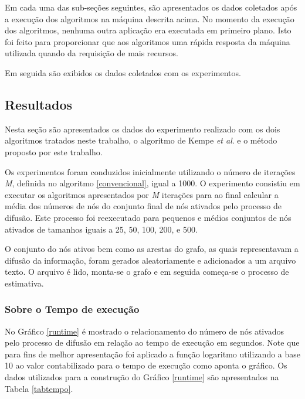 \documentclass{acm_proc_article-sp}
\begin{document}
Em cada uma das sub-seções seguintes, são apresentados os dados coletados após a execução dos algoritmos na
máquina descrita acima. No momento da execução dos algoritmos, nenhuma outra aplicação era executada em primeiro
plano. Isto foi feito para proporcionar que aos algoritmos uma rápida resposta da máquina utilizada quando da
requisição de mais recursos.

Em seguida são exibidos os dados coletados com os experimentos.

\subsection{Resultados}
Nesta seção são apresentados os dados do experimento realizado com os dois algoritmos tratados neste trabalho, o
algoritmo de Kempe \textit{et al}. e o método proposto por este trabalho.

Os experimentos foram conduzidos inicialmente utilizando o número de iterações \textit{M}, definida no algoritmo
\ref{convencional}, igual a 1000. O experimento consistiu em executar os algoritmos apresentados por \textit{M}
iterações para ao final calcular a média dos números de nós do conjunto final de nós ativados pelo processo de
difusão. Este processo foi reexecutado para pequenos e médios conjuntos de nós ativados de tamanhos iguais a 25,
50, 100, 200, e 500.

O conjunto do nós ativos bem como as arestas do grafo, as quais representavam a difusão da informação, foram 
gerados aleatoriamente e adicionados a um arquivo texto. O arquivo é lido, monta-se o grafo e em seguida começa-se
o processo de estimativa.

\subsubsection{Sobre o Tempo de execução}
No Gráfico \ref{runtime} é mostrado o relacionamento do número de nós ativados pelo processo de difusão em relação
ao tempo de execução em segundos. Note que para fins de melhor apresentação foi aplicado a função logaritmo
utilizando a base 10 ao valor contabilizado para o tempo de execução como aponta o gráfico. Os dados utilizados
para a construção do Gráfico \ref{runtime} são apresentados na Tabela \ref{tabtempo}.
\end{document}
